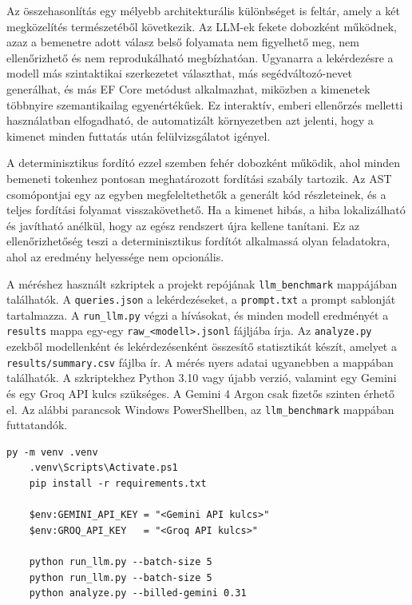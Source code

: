 Az összehasonlítás egy mélyebb architekturális különbséget is feltár, amely a két megközelítés természetéből következik. Az LLM-ek fekete dobozként működnek, azaz a bemenetre adott válasz belső folyamata nem figyelhető meg, nem ellenőrizhető és nem reprodukálható megbízhatóan. Ugyanarra a lekérdezésre a modell más szintaktikai szerkezetet választhat, más segédváltozó-nevet generálhat, és más EF Core metódust alkalmazhat, miközben a kimenetek többnyire szemantikailag egyenértékűek. Ez interaktív, emberi ellenőrzés melletti használatban elfogadható, de automatizált környezetben azt jelenti, hogy a kimenet minden futtatás után felülvizsgálatot igényel.

A determinisztikus fordító ezzel szemben fehér dobozként működik, ahol minden bemeneti tokenhez pontosan meghatározott fordítási szabály tartozik. Az AST csomópontjai egy az egyben megfeleltethetők a generált kód részleteinek, és a teljes fordítási folyamat visszakövethető. Ha a kimenet hibás, a hiba lokalizálható és javítható anélkül, hogy az egész rendszert újra kellene tanítani. Ez az ellenőrizhetőség teszi a determinisztikus fordítót alkalmassá olyan feladatokra, ahol az eredmény helyessége nem opcionális.


A méréshez használt szkriptek a projekt repójának \texttt{llm\_benchmark} mappájában találhatók. A \texttt{queries.json} a lekérdezéseket, a \texttt{prompt.txt} a prompt sablonját tartalmazza. A \texttt{run\_llm.py} végzi a hívásokat, és minden modell eredményét a \texttt{results} mappa egy-egy \texttt{raw\_<modell>.jsonl} fájljába írja. Az \texttt{analyze.py} ezekből modellenként és lekérdezésenként összesítő statisztikát készít, amelyet a \texttt{results/summary.csv} fájlba ír. A mérés nyers adatai ugyanebben a mappában találhatók. A szkriptekhez Python 3.10 vagy újabb verzió, valamint egy Gemini és egy Groq API kulcs szükséges. A Gemini 4 Argon csak fizetős szinten érhető el. Az alábbi parancsok Windows PowerShellben, az \texttt{llm\_benchmark} mappában futtatandók.

\begin{lstlisting}[language={}]
	py -m venv .venv
	.venv\Scripts\Activate.ps1
	pip install -r requirements.txt
	
	$env:GEMINI_API_KEY = "<Gemini API kulcs>"
	$env:GROQ_API_KEY   = "<Groq API kulcs>"
	
	python run_llm.py --batch-size 5
	python run_llm.py --batch-size 5
	python analyze.py --billed-gemini 0.31
\end{lstlisting}

